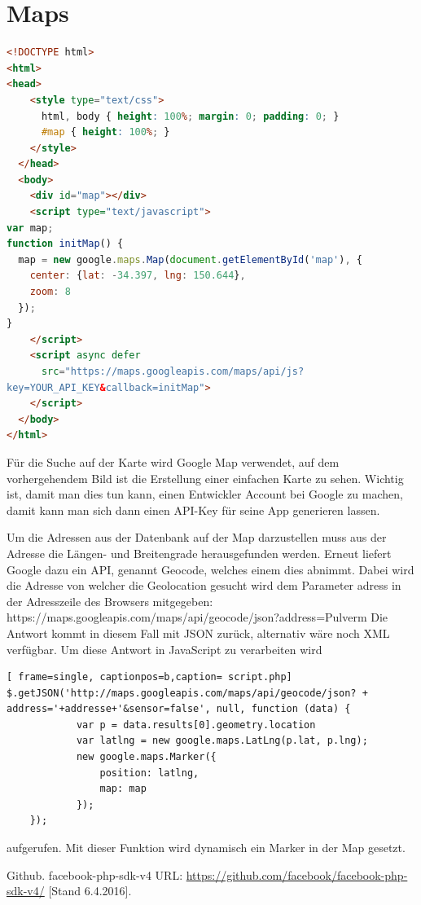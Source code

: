\documentclass[11pt,a4paper]{scrreprt}
\begin{document}
\newpage
\section{Maps}
\begin{lstlisting}[language=HTML, frame=single, captionpos=b]
<!DOCTYPE html>
<html>
<head>
    <style type="text/css">
      html, body { height: 100%; margin: 0; padding: 0; }
      #map { height: 100%; }
    </style>
  </head>
  <body>
    <div id="map"></div>
    <script type="text/javascript">
var map;
function initMap() {
  map = new google.maps.Map(document.getElementById('map'), {
    center: {lat: -34.397, lng: 150.644},
    zoom: 8
  });
}
    </script>
    <script async defer
      src="https://maps.googleapis.com/maps/api/js?
key=YOUR_API_KEY&callback=initMap">
    </script>
  </body>
</html>
\end{lstlisting}

Für die Suche auf der Karte wird Google Map verwendet, auf dem vorhergehendem Bild ist die Erstellung einer einfachen Karte zu sehen. Wichtig ist, damit man dies tun kann, einen Entwickler Account bei Google zu machen, damit kann man sich dann einen API-Key für seine App generieren lassen. 

Um die Adressen aus der Datenbank auf der Map darzustellen muss aus der Adresse die Längen- und Breitengrade herausgefunden werden. Erneut liefert Google dazu ein API, genannt Geocode, welches einem dies abnimmt. Dabei wird die Adresse von welcher die Geolocation gesucht wird dem Parameter adress in der Adresszeile des Browsers mitgegeben:
https://maps.googleapis.com/maps/api/geocode/json?address=Pulverm
Die Antwort kommt in diesem Fall mit JSON zurück, alternativ wäre noch XML verfügbar. Um diese Antwort in JavaScript zu verarbeiten wird        

\begin{lstlisting}[ frame=single, captionpos=b,caption= script.php]
$.getJSON('http://maps.googleapis.com/maps/api/geocode/json? + 
address='+addresse+'&sensor=false', null, function (data) {
            var p = data.results[0].geometry.location
            var latlng = new google.maps.LatLng(p.lat, p.lng);
            new google.maps.Marker({
                position: latlng,
                map: map
            });
    });
\end{lstlisting}
aufgerufen. Mit dieser Funktion wird dynamisch ein Marker in der Map gesetzt. 

\newpage
\begin{thebibliography}{999}

  Github. facebook-php-sdk-v4
 URL: \url{https://github.com/facebook/facebook-php-sdk-v4/} [Stand 6.4.2016].
\end{thebibliography}
\end{document}
